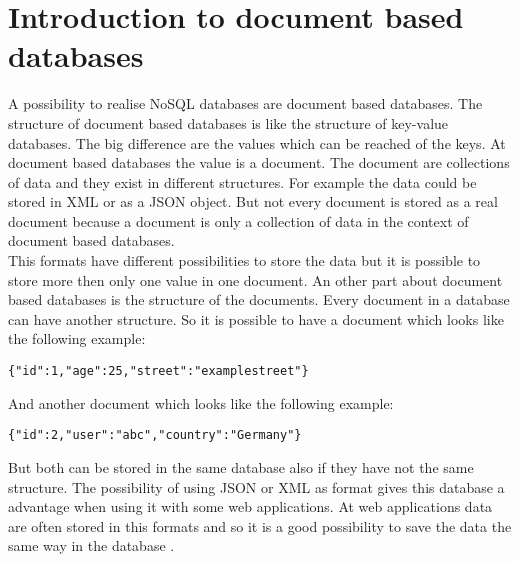 \section{Introduction to document based databases}
A possibility to realise NoSQL databases are document based databases. The structure of document based databases is like the structure of key-value databases. The big difference are the values which can be reached of the keys. At document based databases the value is a document. The document are collections of data and they exist in different structures. For example the data could be stored in XML or as a JSON object. But not every document is stored as a real document because a document is only a collection of data in the context of document based databases. \\
This formats have different possibilities to store the data but it is possible to store more then only one value in one document. An other part about document based databases is the structure of the documents. Every document in a database can have another structure. 
So it is possible to have a document which looks like the following example:
\begin{lstlisting}[frame=single, caption=Example]
{"id":1,"age":25,"street":"examplestreet"}
\end{lstlisting}
And another document which looks like the following example: 
\begin{lstlisting}[Example of an other document]
{"id":2,"user":"abc","country":"Germany"}
\end{lstlisting}
%
But both can be stored in the same database also if they have not the same structure. 
The possibility of using JSON or XML as format gives this database a advantage when using it with some web applications. At web applications data are often stored in this formats and so it is a good possibility to save the data the same way in the database \parencite{DocDBIntro1,DocDBIntro2,DocDBIntro3}.

